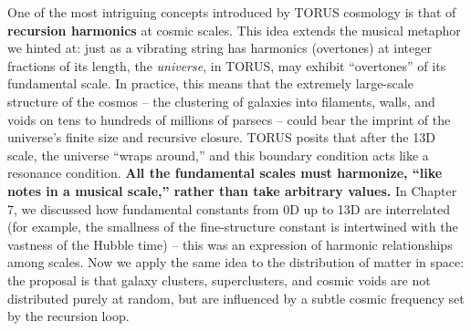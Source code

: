 \documentclass[
]{article}
\begin{document}
{One of the most intriguing concepts introduced by TORUS cosmology is
that of \textbf{recursion harmonics} at cosmic scales. This idea extends
the musical metaphor we hinted at: just as a vibrating string has
harmonics (overtones) at integer fractions of its length, the
\emph{universe}, in TORUS, may exhibit ``overtones'' of its fundamental
scale. In practice, this means that the extremely large-scale structure
of the cosmos -- the clustering of galaxies into filaments, walls, and
voids on tens to hundreds of millions of parsecs -- could bear the
imprint of the universe's finite size and recursive closure. TORUS
posits that after the 13D scale, the universe ``wraps around,'' and this
boundary condition acts like a resonance condition. \textbf{All the
fundamental scales must harmonize, ``like notes in a musical scale,''
rather than take arbitrary values\hspace{0pt}.} In Chapter 7, we
discussed how fundamental constants from 0D up to 13D are interrelated
(for example, the smallness of the fine-structure constant \alpha is
intertwined with the vastness of the Hubble time) -- this was an
expression of harmonic relationships among scales. Now we apply the same
idea to the distribution of matter in space: the proposal is that galaxy
clusters, superclusters, and cosmic voids are not distributed purely at
random, but are influenced by a subtle cosmic frequency set by the
recursion loop.

}
\end{document}
